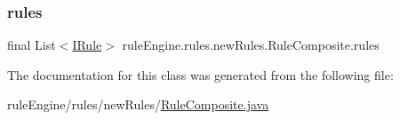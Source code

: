 \subsubsection{\texorpdfstring{rules}{rules}}
{\footnotesize\ttfamily final List$<$\mbox{\hyperlink{interfacerule_engine_1_1rules_1_1new_rules_1_1_i_rule}{I\+Rule}}$>$ rule\+Engine.\+rules.\+new\+Rules.\+Rule\+Composite.\+rules\hspace{0.3cm}{\ttfamily [protected]}}



The documentation for this class was generated from the following file\+:\begin{DoxyCompactItemize}
\item 
rule\+Engine/rules/new\+Rules/\mbox{\hyperlink{_rule_composite_8java}{Rule\+Composite.\+java}}\end{DoxyCompactItemize}
